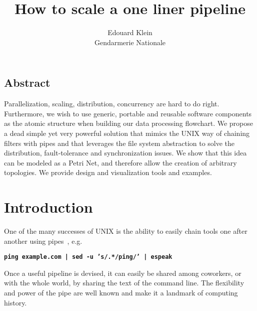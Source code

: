 \documentclass[letterpaper,twocolumn,10pt]{article}
\begin{document}
\date{}

\title{\Large \bf How to scale a one liner pipeline}


\author{
{\rm Edouard Klein}\\
Gendarmerie Nationale
} %

\maketitle



\subsection*{Abstract}
Parallelization, scaling, distribution, concurrency are hard to do right. Furthermore, we wish to use generic, portable and reusable software components as the atomic structure when building our data processing flowchart. We propose a dead simple yet very powerful solution that mimics the UNIX way of chaining filters with pipes and that leverages the file system abstraction to solve the distribution, fault-tolerance and synchronization issues. We show that this idea can be modeled as a Petri Net, and therefore allow the creation of arbitrary topologies. We provide design and visualization tools and examples. 

\section{Introduction}
One of the many successes of UNIX is the ability to easily chain tools one after another using pipes~\cite{ritchie1984}, e.g.

{\bf \tt ping example.com | sed -u 's/.*/ping/' | espeak \\}

Once a useful pipeline is devised, it can easily be shared among coworkers, or with the whole world, by sharing the text of the command line\cite{commandlinefucom,climagic}.
The flexibility and power of the pipe are well known and make it a landmark of computing history.
\end{document}
